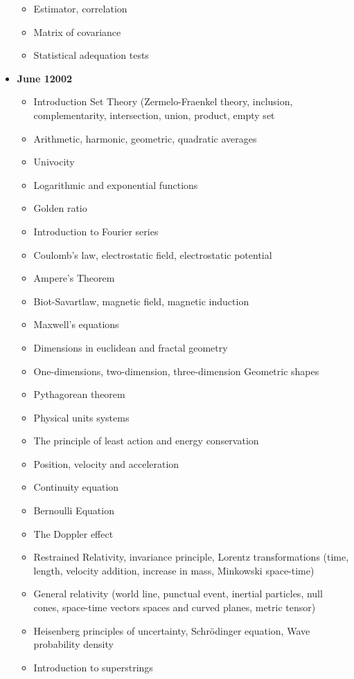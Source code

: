 \begin{itemize}
\begin{itemize}[noitemsep]
				\item Estimator, correlation
				\item Matrix of covariance
				\item Statistical adequation tests
			\end{itemize}
		\item \textbf{June 12002}
			\begin{itemize}[noitemsep]
				\item Introduction Set Theory (Zermelo-Fraenkel theory, inclusion, complementarity, intersection, union, product, empty set
				\item Arithmetic, harmonic, geometric, quadratic averages
				\item Univocity
				\item Logarithmic and exponential functions
				\item Golden ratio
				\item Introduction to Fourier series
				\item Coulomb's law, electrostatic field, electrostatic potential
				\item Ampere's Theorem
				\item Biot-Savartlaw, magnetic field, magnetic induction
				\item Maxwell's equations
				\item Dimensions in euclidean and fractal geometry
				\item One-dimensions, two-dimension, three-dimension Geometric shapes
				\item Pythagorean theorem
				\item Physical units systems
				\item The principle of least action and energy conservation
				\item Position, velocity and acceleration
				\item Continuity equation
				\item Bernoulli Equation
				\item The Doppler effect
				\item Restrained Relativity, invariance principle, Lorentz transformations (time, length, velocity addition, increase in mass, Minkowski space-time)
				\item General relativity (world line, punctual event, inertial particles, null cones, space-time vectors spaces and curved planes, metric tensor)
				\item Heisenberg principles of uncertainty, Schrödinger equation, Wave probability density
				\item Introduction to superstrings

\end{itemize}
\end{itemize}

